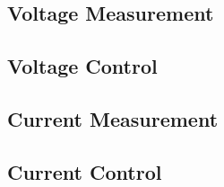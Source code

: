 \subsection{Voltage Measurement}


\subsection{Voltage Control}


\subsection{Current Measurement}


\subsection{Current Control}